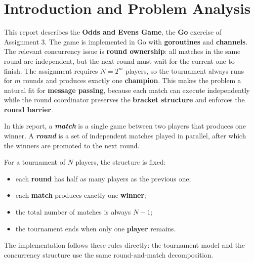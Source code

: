 \section{Introduction and Problem Analysis}

This report describes the \textbf{Odds and Evens Game}, the \textbf{Go} exercise of Assignment 3.
The game is implemented in Go with \textbf{goroutines} and \textbf{channels}.
The relevant concurrency issue is \textbf{round ownership}: all matches in the same round are independent, but the next round
must wait for the current one to finish.
The assignment requires $N = 2^m$ players, so the tournament always runs for $m$ rounds and produces exactly one
\textbf{champion}.
This makes the problem a natural fit for \textbf{message passing}, because each match can execute independently while the
round coordinator preserves the \textbf{bracket structure} and enforces the \textbf{round barrier}.

In this report, a \emph{\textbf{match}} is a single game between two players that produces one winner.
A \emph{\textbf{round}} is a set of independent matches played in parallel, after which the winners are promoted to the next round.

For a tournament of $N$ players, the structure is fixed:
\begin{itemize}
    \item each \textbf{round} has half as many players as the previous one;
    \item each \textbf{match} produces exactly one \textbf{winner};
    \item the total number of matches is always $N - 1$;
    \item the tournament ends when only one \textbf{player} remains.
\end{itemize}

The implementation follows these rules directly: the tournament model and the concurrency structure use the same
round-and-match decomposition.
